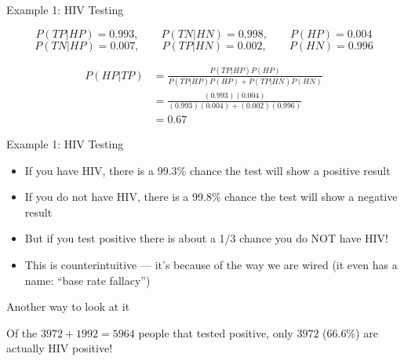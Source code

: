 \documentclass{beamer}\usepackage[]{graphicx}\usepackage[]{color}
\begin{document}
\begin{darkframes}
\begin{frame}{Example 1: HIV Testing}

\[ P(TP|HP) = 0.993, \qquad P(TN|HN) = 0.998, \qquad P(HP) = 0.004 \]
\[ P(TN|HP) = 0.007, \qquad P(TP|HN) = 0.002, \qquad P(HN) = 0.996 \]

\begin{align*}
  P(HP|TP) &= \frac{ P(TP|HP)P(HP) }{ P(TP|HP)P(HP) + P(TP|HN)P(HN) } \\
  &= \frac{ (0.993)(0.004) }{ (0.993)(0.004) + (0.002)(0.996) } \\
  &= 0.67
\end{align*}
\end{frame}

\begin{frame}{Example 1: HIV Testing}
  \begin{itemize}[<+->]
    \item If you have HIV, there is a 99.3\% chance the test will show a positive result
    \item If you do not have HIV, there is a 99.8\% chance the test will show a negative result
    \item But if you test positive there is about a 1/3 chance you do NOT have HIV!
    \item This is counterintuitive --- it's because of the way we are wired (it even has a name: ``base rate fallacy'')
  \end{itemize}
\end{frame}

\begin{frame}{Another way to look at it}
  \pause

  Of the $3972+1992=5964$ people that tested positive, only $3972$ (66.6\%) are actually HIV positive!
  \lc
\end{frame}


\end{darkframes}
\end{document}
